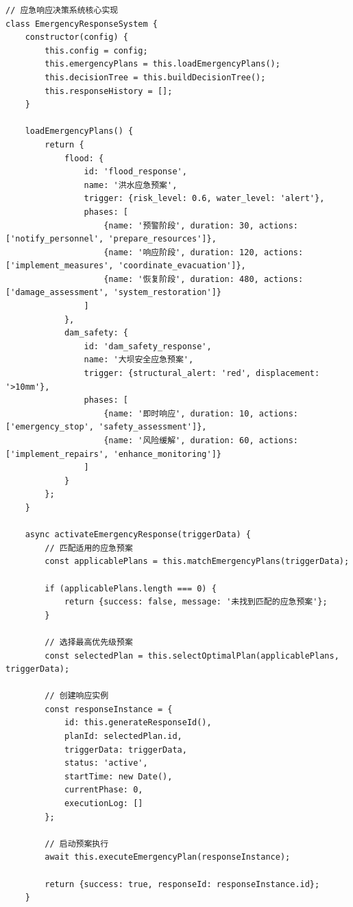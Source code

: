 \begin{lstlisting}[style=javascript]
// 应急响应决策系统核心实现
class EmergencyResponseSystem {
    constructor(config) {
        this.config = config;
        this.emergencyPlans = this.loadEmergencyPlans();
        this.decisionTree = this.buildDecisionTree();
        this.responseHistory = [];
    }
    
    loadEmergencyPlans() {
        return {
            flood: {
                id: 'flood_response',
                name: '洪水应急预案',
                trigger: {risk_level: 0.6, water_level: 'alert'},
                phases: [
                    {name: '预警阶段', duration: 30, actions: ['notify_personnel', 'prepare_resources']},
                    {name: '响应阶段', duration: 120, actions: ['implement_measures', 'coordinate_evacuation']},
                    {name: '恢复阶段', duration: 480, actions: ['damage_assessment', 'system_restoration']}
                ]
            },
            dam_safety: {
                id: 'dam_safety_response', 
                name: '大坝安全应急预案',
                trigger: {structural_alert: 'red', displacement: '>10mm'},
                phases: [
                    {name: '即时响应', duration: 10, actions: ['emergency_stop', 'safety_assessment']},
                    {name: '风险缓解', duration: 60, actions: ['implement_repairs', 'enhance_monitoring']}
                ]
            }
        };
    }
    
    async activateEmergencyResponse(triggerData) {
        // 匹配适用的应急预案
        const applicablePlans = this.matchEmergencyPlans(triggerData);
        
        if (applicablePlans.length === 0) {
            return {success: false, message: '未找到匹配的应急预案'};
        }
        
        // 选择最高优先级预案
        const selectedPlan = this.selectOptimalPlan(applicablePlans, triggerData);
        
        // 创建响应实例
        const responseInstance = {
            id: this.generateResponseId(),
            planId: selectedPlan.id,
            triggerData: triggerData,
            status: 'active',
            startTime: new Date(),
            currentPhase: 0,
            executionLog: []
        };
        
        // 启动预案执行
        await this.executeEmergencyPlan(responseInstance);
        
        return {success: true, responseId: responseInstance.id};
    }
    

\end{lstlisting}
